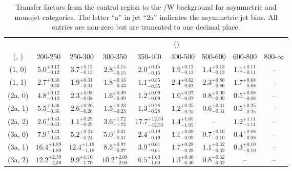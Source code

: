\begin{table}[h!]
\tiny
\centering
\caption{Transfer factors from the \mmj control region to the \ttbar/W background for asymmetric and monojet categories. The letter ``a'' in jet \eg ``2a''  indicates the asymmetric jet bins. All entries are non-zero but are truncated to one decimal place.\label{tab:tf_mumu_ttw_asym}}
\begin{tabular}
{ccccccccc}
	\hline\hline
&	& \multicolumn{8}{c}{\scalht (\gev)} \\ 
	 (\njet,  \nb) & 200-250 & 250-300 & 300-350 & 350-400 & 400-500 & 500-600 & 600-800 & 800-$\infty$ \\ [0.8ex] 
\hline
	(1, 0) & $5.0^{+ 0.12 }_{- 0.12 }$ & $3.7^{+ 0.13 }_{- 0.13 }$ & $2.8^{+ 0.15 }_{- 0.15 }$ & $2.0^{+ 0.15 }_{- 0.15 }$ & $1.9^{+ 0.12 }_{- 0.12 }$ & $1.4^{+ 0.13 }_{- 0.13 }$ & $1.1^{+ 0.11 }_{- 0.11 }$ & -- \\[0.5ex] 
	(1, 1) & $2.7^{+ 0.30 }_{- 0.30 }$ & $1.9^{+ 0.31 }_{- 0.31 }$ & $1.8^{+ 0.43 }_{- 0.43 }$ & $1.1^{+ 0.35 }_{- 0.35 }$ & $2.4^{+ 0.62 }_{- 0.62 }$ & $2.3^{+ 0.86 }_{- 0.86 }$ & $1.7^{+ 0.68 }_{- 0.68 }$ & -- \\[0.5ex] 
	(2a, 0) & $4.8^{+ 0.12 }_{- 0.12 }$ & $2.3^{+ 0.08 }_{- 0.08 }$ & $1.6^{+ 0.09 }_{- 0.09 }$ & $1.2^{+ 0.09 }_{- 0.09 }$ & $1.0^{+ 0.07 }_{- 0.07 }$ & $0.8^{+ 0.09 }_{- 0.09 }$ & $0.5^{+ 0.08 }_{- 0.08 }$ & -- \\[0.5ex] 
	(2a, 1) & $5.5^{+ 0.36 }_{- 0.36 }$ & $2.6^{+ 0.26 }_{- 0.26 }$ & $1.5^{+ 0.23 }_{- 0.23 }$ & $1.3^{+ 0.28 }_{- 0.28 }$ & $1.2^{+ 0.25 }_{- 0.25 }$ & $0.6^{+ 0.31 }_{- 0.31 }$ & $0.5^{+ 0.25 }_{- 0.25 }$ & -- \\[0.5ex] 
	(2a, 2) & $2.6^{+ 0.43 }_{- 0.43 }$ & $1.1^{+ 0.29 }_{- 0.29 }$ & $3.6^{+ 1.72 }_{- 1.72 }$ & $17.7^{+ 12.53 }_{- 12.53 }$ & $1.4^{+ 1.05 }_{- 1.05 }$ & -- & $1.2^{+ 1.11 }_{- 1.11 }$ & -- \\[0.5ex] 
	(3a, 0) & $7.9^{+ 0.43 }_{- 0.43 }$ & $5.2^{+ 0.24 }_{- 0.24 }$ & $5.0^{+ 0.31 }_{- 0.31 }$ & $2.4^{+ 0.19 }_{- 0.19 }$ & $1.1^{+ 0.09 }_{- 0.09 }$ & $0.7^{+ 0.10 }_{- 0.10 }$ & $0.4^{+ 0.08 }_{- 0.08 }$ & -- \\[0.5ex] 
	(3a, 1) & $16.4^{+ 1.89 }_{- 1.89 }$ & $12.4^{+ 1.18 }_{- 1.18 }$ & $8.5^{+ 0.97 }_{- 0.97 }$ & $3.9^{+ 0.61 }_{- 0.61 }$ & $1.7^{+ 0.28 }_{- 0.28 }$ & $1.1^{+ 0.32 }_{- 0.32 }$ & $0.3^{+ 0.10 }_{- 0.10 }$ & -- \\[0.5ex] 
	(3a, 2) & $12.2^{+ 2.39 }_{- 2.39 }$ & $9.9^{+ 1.70 }_{- 1.70 }$ & $10.2^{+ 2.08 }_{- 2.08 }$ & $6.5^{+ 1.60 }_{- 1.60 }$ & $1.3^{+ 0.40 }_{- 0.40 }$ & $0.8^{+ 0.62 }_{- 0.62 }$ & -- & -- \\[0.5ex] 

\end{tabular}
\end{table}
